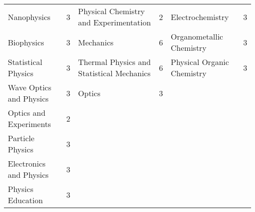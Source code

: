\documentclass{bmcart}
\begin{document}
\begin{landscape}
\begin{longtable}{p{3.5cm}|p{1cm}|p{7cm}|p{1cm}|p{7cm}|p{1cm}}
\scriptsize Nanophysics & \scriptsize 3 & \scriptsize Physical Chemistry and Experimentation & \scriptsize 2 & \scriptsize Electrochemistry & \scriptsize 3 \\
\scriptsize Biophysics & \scriptsize 3 & \scriptsize Mechanics & \scriptsize 6 & \scriptsize Organometallic Chemistry & \scriptsize 3 \\
\scriptsize Statistical Physics & \scriptsize 3 & \scriptsize Thermal Physics and Statistical Mechanics & \scriptsize 6 & \scriptsize Physical Organic Chemistry & \scriptsize 3 \\
\scriptsize Wave Optics and Physics & \scriptsize 3 & \scriptsize Optics & \scriptsize 3 & \scriptsize & \scriptsize \\
\scriptsize Optics and Experiments & \scriptsize 2 & \scriptsize & \scriptsize & \scriptsize & \scriptsize \\
\scriptsize Particle Physics & \scriptsize 3 & \scriptsize & \scriptsize & \scriptsize & \scriptsize \\
\scriptsize Electronics and Physics & \scriptsize 3 & \scriptsize & \scriptsize & \scriptsize & \scriptsize \\
\scriptsize Physics Education & \scriptsize 3 & \scriptsize & \scriptsize & \scriptsize & \scriptsize \\

\end{longtable}

\end{landscape}
\end{document}
